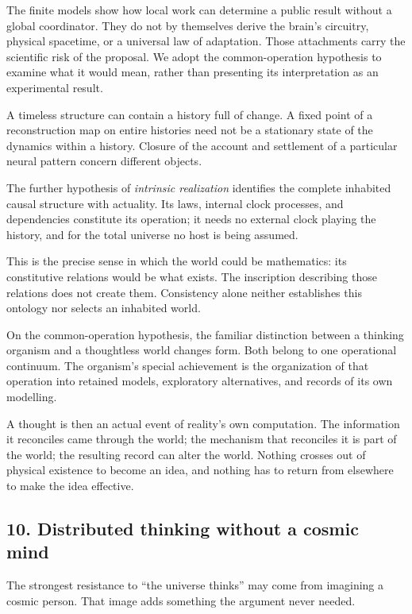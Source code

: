 \documentclass[
  11pt,
]{article}
\begin{document}
The finite models show how local work can determine a public result
without a global coordinator. They do not by themselves derive the
brain's circuitry, physical spacetime, or a universal law of adaptation.
Those attachments carry the scientific risk of the proposal. We adopt
the common-operation hypothesis to examine what it would mean, rather
than presenting its interpretation as an experimental result.

A timeless structure can contain a history full of change. A fixed point
of a reconstruction map on entire histories need not be a stationary
state of the dynamics within a history. Closure of the account and
settlement of a particular neural pattern concern different objects.

The further hypothesis of \emph{intrinsic realization} identifies the
complete inhabited causal structure with actuality. Its laws, internal
clock processes, and dependencies constitute its operation; it needs no
external clock playing the history, and for the total universe no host
is being assumed.

This is the precise sense in which the world could be mathematics: its
constitutive relations would be what exists. The inscription describing
those relations does not create them. Consistency alone neither
establishes this ontology nor selects an inhabited world.

On the common-operation hypothesis, the familiar distinction between a
thinking organism and a thoughtless world changes form. Both belong to
one operational continuum. The organism's special achievement is the
organization of that operation into retained models, exploratory
alternatives, and records of its own modelling.

A thought is then an actual event of reality's own computation. The
information it reconciles came through the world; the mechanism that
reconciles it is part of the world; the resulting record can alter the
world. Nothing crosses out of physical existence to become an idea, and
nothing has to return from elsewhere to make the idea effective.

\subsection{10. Distributed thinking without a cosmic
mind}\label{distributed-thinking-without-a-cosmic-mind}

The strongest resistance to ``the universe thinks'' may come from
imagining a cosmic person. That image adds something the argument never
needed.
\end{document}
